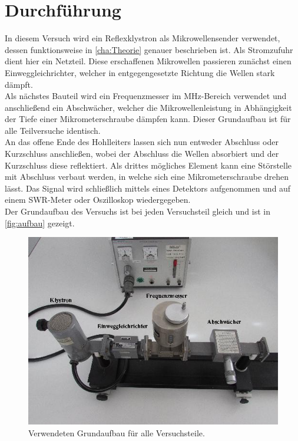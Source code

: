 \chapter{Durchführung}
\label{cha:Durchführung}
In diesem Versuch wird ein Reflexklystron als Mikrowellensender verwendet, dessen funktionsweise in \autoref{cha:Theorie} genauer beschrieben ist. 
Als Stromzufuhr dient hier ein Netzteil. Diese erschaffenen Mikrowellen passieren zunächst einen Einweggleichrichter, welcher in entgegengesetzte Richtung
die Wellen stark dämpft.\\
Als nächstes Bauteil wird ein Frequenzmesser im MHz-Bereich verwendet und anschließend ein Abschwächer, welcher die Mikrowellenleistung in Abhängigkeit der Tiefe
einer Mikrometerschraube dämpfen kann. Dieser Grundaufbau ist für alle Teilversuche identisch.\\
An das offene Ende des Hohlleiters lassen sich nun entweder Abschluss oder Kurzschluss anschließen, wobei der Abschluss die Wellen absorbiert und der Kurzschluss diese
reflektiert. Als drittes mögliches Element kann eine Störstelle mit Abschluss verbaut werden, in welche sich eine Mikrometerschraube drehen lässt. Das Signal wird schließlich
mittels eines Detektors aufgenommen und auf einem SWR-Meter oder Oszilloskop wiedergegeben.\\
Der Grundaufbau des Versuchs ist bei jeden Versuchsteil gleich und ist in \autoref{fig:aufbau} gezeigt.
\begin{figure}
    \centering
    \includegraphics[scale=0.4]{content/V53_pictures/Aufbau.png}
    \caption{Verwendeten Grundaufbau für alle Versuchsteile. \cite{v53}}
    \label{fig:aufbau}
\end{figure}
